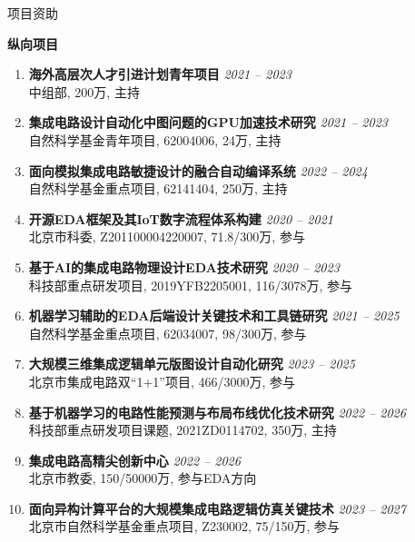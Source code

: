 
\begin{rSection}{项目资助}


\textbf{纵向项目}
        
\begin{enumerate}[font=\normalfont]

\item
{\bf 海外高层次人才引进计划青年项目 } \hfill{\em 2021 -- 2023} \\
中组部, 200万, 主持

\item 
{\bf 集成电路设计自动化中图问题的GPU加速技术研究 } \hfill{\em 2021 -- 2023} \\
自然科学基金青年项目, 62004006, 24万, 主持

\item 
{\bf 面向模拟集成电路敏捷设计的融合自动编译系统 } \hfill{\em 2022 -- 2024} \\
自然科学基金重点项目, 62141404, 250万, 主持

\item 
{\bf 开源EDA框架及其IoT数字流程体系构建 } \hfill{\em 2020 -- 2021} \\
北京市科委, Z201100004220007, 71.8/300万, 参与

\item 
{\bf 基于AI的集成电路物理设计EDA技术研究 } \hfill{\em 2020 -- 2023} \\
科技部重点研发项目, 2019YFB2205001, 116/3078万, 参与

\item 
{\bf 机器学习辅助的EDA后端设计关键技术和工具链研究 } \hfill{\em 2021 -- 2025} \\
自然科学基金重点项目, 62034007, 98/300万, 参与

\item 
{\bf 大规模三维集成逻辑单元版图设计自动化研究 } \hfill{\em 2023 -- 2025} \\
北京市集成电路双``1+1''项目, 466/3000万, 参与

\item 
{\bf 基于机器学习的电路性能预测与布局布线优化技术研究 } \hfill{\em 2022 -- 2026} \\
科技部重点研发项目课题, 2021ZD0114702, 350万, 主持

\item 
{\bf 集成电路高精尖创新中心 } \hfill{\em 2022 -- 2026} \\
北京市教委, 150/50000万, 参与EDA方向

\item 
{\bf 面向异构计算平台的大规模集成电路逻辑仿真关键技术 } \hfill{\em 2023 -- 2027} \\
北京市自然科学基金重点项目, Z230002, 75/150万, 参与


\end{enumerate}
\end{rSection}
